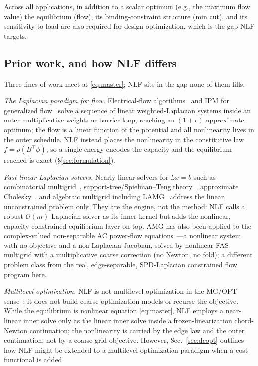 \documentclass{siamart220329}
\newcommand{\Om}{\mathcal{O}(m)}
\begin{document}
Across all applications, in addition to a scalar optimum (e.g., the maximum flow value) the equilibrium (flow), its
binding-constraint structure (min cut), and its sensitivity to load are also required for design optimization, which is the gap NLF targets.

\subsection{Prior work, and how NLF differs}\label{sec:priorwork}
Three lines of work meet at \eqref{eq:master}; NLF sits in the gap none of them fills.

\emph{The Laplacian paradigm for flow.} Electrical-flow algorithms~\cite{christiano-etal} and
IPM for generalized flow~\cite{daitch-spielman} solve a sequence of linear
weighted-Laplacian systems inside an outer multiplicative-weights or barrier loop, reaching an
$(1+\epsilon)$-approximate optimum; the flow is a linear function of the potential and all
nonlinearity lives in the outer schedule. NLF instead places the nonlinearity in the constitutive
law $f=\rho(B^{\top}\phi)$, so a single energy encodes the capacity and the
equilibrium reached is exact (\S\ref{sec:formulation}).

\emph{Fast linear Laplacian solvers.} Nearly-linear solvers for $Lx=b$ such as combinatorial
multigrid~\cite{koutis-cmg}, support-tree/Spielman--Teng theory~\cite{spielman-teng}, approximate
Cholesky~\cite{approxchol,gks2023}, and algebraic multigrid including
LAMG~\cite{lamg} address the linear, unconstrained problem only. They are the engine, not
the method: NLF calls a robust $\Om$ Laplacian solver as its inner kernel but adds the
nonlinear, capacity-constrained equilibrium layer on top. AMG has also been applied to the
complex-valued non-separable AC power-flow equations~\cite{bindel-amg-pf}---a nonlinear system
with no objective and a non-Laplacian Jacobian, solved by nonlinear FAS multigrid with a multiplicative coarse correction (no Newton, no fold); a different problem class from the
real, edge-separable, SPD-Laplacian constrained flow program here.

\emph{Multilevel optimization.} NLF is not multilevel optimization in the MG/OPT
sense~\cite{nash-mgopt,gratton-rmtr,brandt-ron-mgopt}: it does not build coarse optimization models or recurse
the objective. While the equilibrium is nonlinear equation \eqref{eq:master}, NLF employs a near-linear inner solve only as the linear inner solve inside a frozen-linearization chord-Newton
continuation; the nonlinearity is carried by the edge law and the outer continuation, not by a
coarse-grid objective. However, Sec.~\ref{sec:dcopt} outlines how NLF might be extended to a multilevel optimization paradigm when a cost functional is added.
\end{document}
